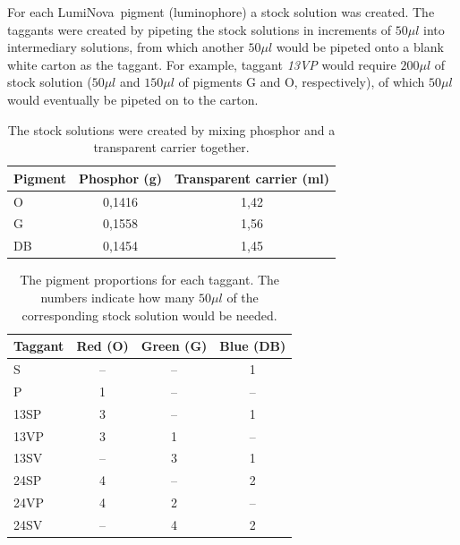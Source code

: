 \documentclass[thesis.tex]{subfiles}
\begin{document}
For each LumiNova\textregistered\ pigment (luminophore) a stock solution was created. The taggants were created by pipeting the stock solutions in increments of $50\mu l$ into intermediary solutions, from which another $50\mu l$ would be pipeted onto a blank white carton as the taggant. For example, taggant \emph{13VP} would require $200\mu l$ of stock solution ($50\mu l$ and $150\mu l$ of pigments G and O, respectively), of which $50\mu l$ would eventually be pipeted on to the carton.
\vspace{-1em}
\begin{table}[ht]
  \caption{The stock solutions were created by mixing phosphor and a transparent carrier together.}

  \begin{center}
  \begin{tabular}{| m{1.75cm} | c | c |}
    \hline
    \textbf{Pigment}  & \textbf{Phosphor (g)} & \textbf{Transparent carrier (ml)} \\ \hline
    O & 0,1416 & 1,42 \\
    \hline
    G & 0,1558 & 1,56 \\
    \hline
    DB & 0,1454 & 1,45 \\
    \hline
  \end{tabular}
  \end{center}
\end{table}
\vspace{-2.75em}
\begin{table}[ht]
  \caption{The pigment proportions for each taggant. The numbers indicate how many $50\mu l$ of the corresponding stock solution would be needed.}

  \begin{center}
  \begin{tabular}{| m{1.75cm} | c | c | c |}
    \hline
    \textbf{Taggant}  & \textbf{Red (O)} & \textbf{Green (G)} & \textbf{Blue (DB)} \\ \hline
    S & -- & -- & 1 \\
    \hline
    P & 1 & -- & -- \\
    \hline
    13SP & 3 & -- & 1 \\
    \hline
    13VP & 3 & 1 & -- \\
    \hline
    13SV & -- & 3 & 1 \\
    \hline
    24SP & 4 & -- & 2 \\
    \hline
    24VP  & 4 & 2 & -- \\
    \hline
    24SV & -- & 4 & 2 \\
    \hline
  \end{tabular}
  \end{center}
\end{table}
\end{document}
